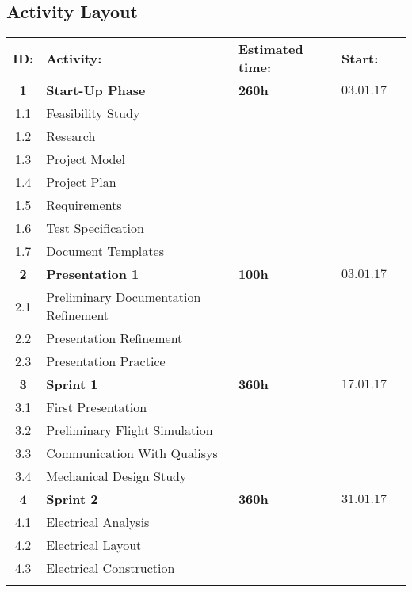 \begin{center}
\section*{\textbf{Activity Layout}}
\begin{tabular}{cllll}
\rowcolor{cadetgrey}
\textbf{ID:}    &\textbf{Activity:} 	 &\textbf{Estimated time:}    &\textbf{Start:}  \\ %
    
\textbf{1} & \textbf{Start-Up Phase} & \textbf{260h} & $03.01.17$ 
\\\rowcolor{gainsboro}
1.1       & Feasibility Study     &     &  \\
1.2       & Research     &     &  \\\rowcolor{gainsboro}
1.3       & Project Model     &     & \\
1.4       & Project Plan     &     & 
\\\rowcolor{gainsboro}
1.5       & Requirements     &     & \\
1.6       & Test Specification     &     & 
\\\rowcolor{gainsboro}
1.7       & Document Templates     &    & \\
\textbf{2} & \textbf{Presentation 1}     & \textbf{100h}    & $03.01.17$ 
\\\rowcolor{gainsboro}
2.1     & Preliminary Documentation Refinement  &    & \\
2.2     & Presentation Refinement  &    &
\\\rowcolor{gainsboro}
2.3     & Presentation Practice  &    & \\
\textbf{3} & \textbf{Sprint 1}     & \textbf{360h}     & $17.01.17$ 
\\\rowcolor{gainsboro}
3.1     & First Presentation &  & \\
3.2     & Preliminary Flight Simulation &  & \\\rowcolor{gainsboro}
3.3     & Communication With Qualisys &  & \\
3.4     & Mechanical Design Study &  & 
\\\rowcolor{gainsboro}
\textbf{4} & \textbf{Sprint 2}     & \textbf{360h}     & $31.01.17$ \\
4.1     & Electrical Analysis &  &  \\\rowcolor{gainsboro}
4.2     & Electrical Layout &  & \\
4.3     & Electrical Construction & & \\ \rowcolor{gainsboro}

\end{tabular}
\end{center}
